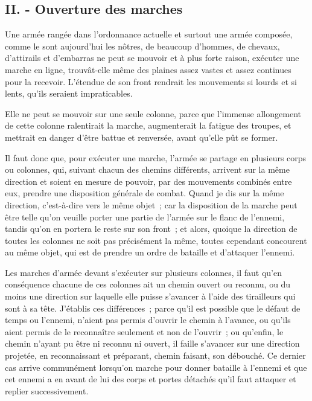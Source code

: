 \documentclass[french,twoside]{book} %
\begin{document}
\subsection[{II. - Ouverture des marches}]{II. - Ouverture des marches}
\noindent Une armée rangée dans l’ordonnance actuelle et surtout une armée composée, comme le sont aujourd’hui les nôtres, de beaucoup d’hommes, de chevaux, d’attirails et d’embarras ne peut se mouvoir et à plus forte raison, exécuter une marche en ligne, trouvât-elle même des plaines assez vastes et assez continues pour la recevoir. L’étendue de son front rendrait les mouvements si lourds et si lents, qu’ils seraient impraticables.\par
Elle ne peut se mouvoir sur une seule colonne, parce que l’immense allongement de cette colonne ralentirait la marche, augmenterait la fatigue des troupes, et mettrait en danger d’être battue et renversée, avant qu’elle pût se former.\par
Il faut donc que, pour exécuter une marche, l’armée se partage en plusieurs corps ou colonnes, qui, suivant chacun des chemins différents, arrivent sur la même direction et soient en mesure de pouvoir, par des mouvements combinés entre eux, prendre une disposition générale de combat. Quand je dis sur la même direction, c’est-à-dire vers le même objet ; car la disposition de la marche peut être telle qu’on veuille porter une partie de l’armée sur le flanc de l’ennemi, tandis qu’on en portera le reste sur son front ; et alors, quoique la direction de toutes les colonnes ne soit pas précisément la même, toutes cependant concourent au même objet, qui est de prendre un ordre de bataille et d’attaquer l’ennemi.\par
Les marches d’armée devant s’exécuter sur plusieurs colonnes, il faut qu’en conséquence chacune de ces colonnes ait un chemin ouvert ou reconnu, ou du moins une direction sur laquelle elle puisse s’avancer à l’aide des tirailleurs qui sont à sa tête. J’établis ces différences ; parce qu’il est possible que le défaut de temps ou l’ennemi, n’aient pas permis d’ouvrir le chemin à l’avance, ou qu’ils aient permis de le reconnaître seulement et non de l’ouvrir ; ou qu’enfin, le chemin n’ayant pu être ni reconnu ni ouvert, il faille s’avancer sur une direction projetée, en reconnaissant et préparant, chemin faisant, son débouché. Ce dernier cas arrive communément lorsqu’on marche pour donner bataille à l’ennemi et que cet ennemi a en avant de lui des corps et portes détachés qu’il faut attaquer et replier successivement.\par
\end{document}

